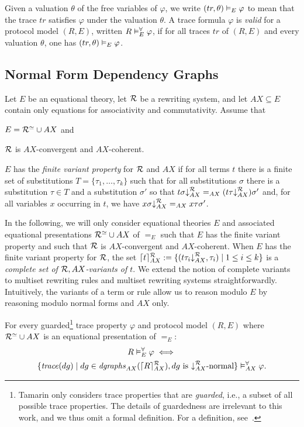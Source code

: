 Given a valuation $\theta$ of the free variables of $\varphi$, we write $(tr, \theta) \vDash_{E} \varphi$ to mean that the trace $tr$ satisfies $\varphi$ under the valuation $\theta$.
A trace formula $\varphi$ is \emph{valid} for a protocol model $(R, E)$, written $R \vDash_{E}^\forall \varphi$, if for all traces $tr$ of $(R, E)$ and every valuation $\theta$, one has $(tr, \theta) \vDash_{E} \varphi$.

\subsection{Normal Form Dependency Graphs}
\label{sec:ndgs}

Let $E$ be an equational theory, let $\mathcal{R}$ be a rewriting system, and let $AX \subseteq E$ contain only equations for associativity and commutativity.
Assume that
\begin{enumerate*}[label=(\roman*)]
  \item $E = \mathcal{R}^\simeq \cup AX$ and
  \item $\mathcal{R}$ is $AX$-convergent and $AX$-coherent.
\end{enumerate*}
$E$ has the \emph{finite variant property} for $\mathcal{R}$ and $AX$ if for all terms $t$ there is a finite set of substitutions $T = \{\tau_1, \dots, \tau_k\}$ such that for all substitutions $\sigma$ there is a substitution $\tau \in T$ and a substitution $\sigma'$ so that $t\sigma {\downarrow}_{AX}^{\mathcal{R}} =_{AX} (t\tau {\downarrow}_{AX}^{\mathcal{R}}) \sigma'$ and, for all variables $x$ occurring in $t$, we have $x\sigma {\downarrow}_{AX}^{\mathcal{R}} =_{AX} x\tau\sigma'$.

In the following, we will only consider equational theories $E$ and associated equational presentations $\mathcal{R}^\simeq \cup AX$ of $=_E$ such that $E$ has the finite variant property and such that $\mathcal{R}$ is $AX$-convergent and $AX$-coherent.
When $E$ has the finite variant property for $\mathcal{R}$, the set $\lceil t \rceil_{AX}^{\mathcal{R}} := \{ (t\tau_i{\downarrow}_{AX}^{\mathcal{R}}, \tau_i) \mid 1 \leq i \leq k \}$ is a \emph{complete set of $\mathcal{R},AX$-variants of $t$}.
We extend the notion of complete variants to multiset rewriting rules and multiset rewriting systems straightforwardly.
Intuitively, the variants of a term or rule allow us to reason modulo $E$ by reasoning modulo normal forms and $AX$ only.

\begin{theorem} \label{thm:reasoning-mod-ax}
  For every guarded\footnote{%
    Tamarin only considers trace properties that are \emph{guarded}, i.e., a subset of all possible trace properties.
    The details of guardedness are irrelevant to this work, and we thus omit a formal definition.
    For a definition, see~\cite{TamarinThesisInduction}.
  } trace property $\varphi$ and protocol model $(R, E)$ where $\mathcal{R}^\simeq \cup AX$ is an equational presentation of $=_E$:
  \begin{multline*}
    R \vDash_{E}^\forall \varphi \iff \\
      \{ \mathit{trace}(dg) \mid dg \in \mathit{dgraphs}_{AX}(\lceil R \rceil_{AX}^{\mathcal{R}}), dg~\text{is}~{\downarrow}_{AX}^{\mathcal{R}}\text{-normal} \} \vDash_{AX}^\forall \varphi.
  \end{multline*}
\end{theorem}
